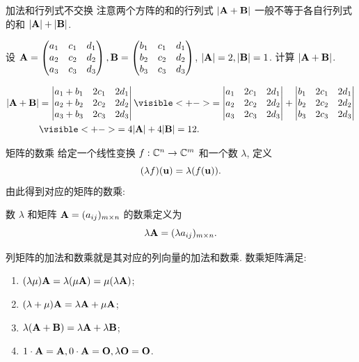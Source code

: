 \begin{frame}{加法和行列式不交换}
	\onslide<+->
	注意两个方阵的和的行列式 $|{\mathbf{A}}+{\mathbf{B}}|$ 一般不等于各自行列式的和 $|{\mathbf{A}}|+|{\mathbf{B}}|$.
	\onslide<+->
	\begin{example}
		设 ${\mathbf{A}}=\begin{pmatrix}
			a_1&c_1&d_1\\
			a_2&c_2&d_2\\
			a_3&c_3&d_3
		\end{pmatrix},{\mathbf{B}}=\begin{pmatrix}
			b_1&c_1&d_1\\
			b_2&c_2&d_2\\
			b_3&c_3&d_3
		\end{pmatrix}$, $|{\mathbf{A}}|=2,|{\mathbf{B}}|=1$.
		计算 $|{\mathbf{A}}+{\mathbf{B}}|$.
	\end{example}
	\onslide<+->
	\begin{solution}
		\begin{align*}
			|\bfA+\bfB|&=\detm{
				a_1+b_1&2c_1&2d_1\\
				a_2+b_2&2c_2&2d_2\\
				a_3+b_3&2c_3&2d_3
			}
			\visible<+->{=\detm{
				a_1&2c_1&2d_1\\
				a_2&2c_2&2d_2\\
				a_3&2c_3&2d_3
			}+\detm{
				b_1&2c_1&2d_1\\
				b_2&2c_2&2d_2\\
				b_3&2c_3&2d_3
			}}\\
			&\visible<+->{=4|\bfA|+4|\bfB|=12.}
		\end{align*}
	\end{solution}
\end{frame}


\begin{frame}{矩阵的数乘}
	\onslide<+->
	给定一个线性变换 $f:{\mathbb{C}}^n\rightarrow{\mathbb{C}}^m$ 和一个数 $\lambda$, 定义
	\[(\lambda f)({\mathbf{u}})=\lambda(f({\mathbf{u}})).\]
	\onslide<+->
	由此得到对应的矩阵的数乘:
	\onslide<+->
	\begin{definition}
		数 $\lambda$ 和矩阵 ${\mathbf{A}}=(a_{ij})_{m\times n}$ 的数乘定义为
		\[\lambda{\mathbf{A}}=(\lambda a_{ij})_{m\times n}.\]
	\end{definition}
	\onslide<+->
	列矩阵的加法和数乘就是其对应的列向量的加法和数乘.
	\onslide<+->
	数乘矩阵满足:
	\begin{enumerate}
		\item $(\lambda \mu){\mathbf{A}}=\lambda(\mu{\mathbf{A}})=\mu(\lambda{\mathbf{A}})$;
		\item $(\lambda+\mu){\mathbf{A}}=\lambda{\mathbf{A}}+\mu{\mathbf{A}}$;
		\item $\lambda({\mathbf{A}}+{\mathbf{B}})=\lambda{\mathbf{A}}+\lambda{\mathbf{B}}$;
		\item $1\cdot {\mathbf{A}}={\mathbf{A}}, 0\cdot{\mathbf{A}}={\mathbf{O}},\lambda{\mathbf{O}}={\mathbf{O}}$.
	\end{enumerate}
\end{frame}


